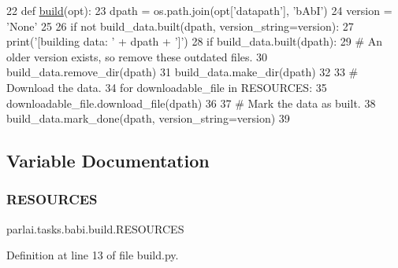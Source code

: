 \begin{DoxyCode}
22 \textcolor{keyword}{def }\hyperlink{namespacedialog__babi__feedback_1_1build_a7a9d289f7493a5ded13c4b7f071b6184}{build}(opt):
23     dpath = os.path.join(opt[\textcolor{stringliteral}{'datapath'}], \textcolor{stringliteral}{'bAbI'})
24     version = \textcolor{stringliteral}{'None'}
25 
26     \textcolor{keywordflow}{if} \textcolor{keywordflow}{not} build\_data.built(dpath, version\_string=version):
27         print(\textcolor{stringliteral}{'[building data: '} + dpath + \textcolor{stringliteral}{']'})
28         \textcolor{keywordflow}{if} build\_data.built(dpath):
29             \textcolor{comment}{# An older version exists, so remove these outdated files.}
30             build\_data.remove\_dir(dpath)
31         build\_data.make\_dir(dpath)
32 
33         \textcolor{comment}{# Download the data.}
34         \textcolor{keywordflow}{for} downloadable\_file \textcolor{keywordflow}{in} RESOURCES:
35             downloadable\_file.download\_file(dpath)
36 
37         \textcolor{comment}{# Mark the data as built.}
38         build\_data.mark\_done(dpath, version\_string=version)
39 \end{DoxyCode}


\subsection{Variable Documentation}
\mbox{\label{namespaceparlai_1_1tasks_1_1babi_1_1build_abde09c52639937c04179eb0a31c5618f}} 
\subsubsection{\texorpdfstring{R\+E\+S\+O\+U\+R\+C\+ES}{RESOURCES}}
{\footnotesize\ttfamily parlai.\+tasks.\+babi.\+build.\+R\+E\+S\+O\+U\+R\+C\+ES}



Definition at line 13 of file build.\+py.

